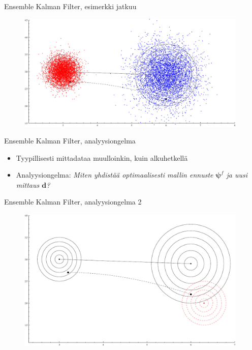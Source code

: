 \documentclass{beamer}
\begin{document}
\begin{frame}{Ensemble Kalman Filter, esimerkki jatkuu}

\begin{figure}
\includegraphics[width=11cm]{enkf4.pdf}
\end{figure}

\end{frame}

\begin{frame}{Ensemble Kalman Filter, analyysiongelma}

\begin{itemize}
\item Tyypillisesti mittadataa muulloinkin, kuin alkuhetkellä
\item Analyysiongelma: \emph{Miten yhdistää optimaalisesti mallin ennuste $\boldsymbol{\psi}^f$ ja uusi mittaus $\boldsymbol{d}$?}
\end{itemize}

\end{frame}

\begin{frame}{Ensemble Kalman Filter, analyysiongelma 2}

\begin{figure}
\includegraphics[width=11cm]{enkf5.pdf}
\end{figure}

\end{frame}
\end{document}
